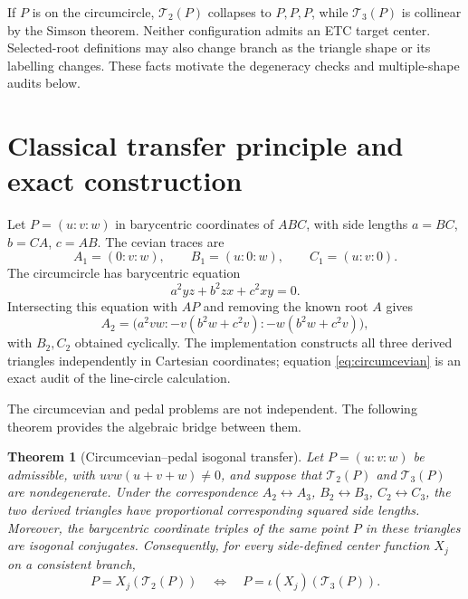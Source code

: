 \documentclass[11pt]{article}
\newtheorem{theorem}{Theorem}
\newcommand{\Circ}{\mathcal T_2}
\newcommand{\Ped}{\mathcal T_3}
\begin{document}
If $P$ is on the circumcircle, $\Circ(P)$ collapses to $P,P,P$, while
$\Ped(P)$ is collinear by the Simson theorem.  Neither configuration admits
an ETC target center.  Selected-root definitions may also change branch as
the triangle shape or its labelling changes.  These facts motivate the
degeneracy checks and multiple-shape audits below.

\section{Classical transfer principle and exact construction}

Let $P=(u:v:w)$ in barycentric coordinates of $ABC$, with side lengths
$a=BC$, $b=CA$, $c=AB$.  The cevian traces are
\[
 A_1=(0:v:w),\qquad B_1=(u:0:w),\qquad C_1=(u:v:0).
\]
The circumcircle has barycentric equation
\[
 a^2yz+b^2zx+c^2xy=0.
\]
Intersecting this equation with $AP$ and removing the known root $A$ gives
\begin{equation}\label{eq:circumcevian}
 A_2=\bigl(a^2vw:-v(b^2w+c^2v):-w(b^2w+c^2v)\bigr),
\end{equation}
with $B_2,C_2$ obtained cyclically.  The implementation constructs all three
derived triangles independently in Cartesian coordinates; equation
\eqref{eq:circumcevian} is an exact audit of the line-circle calculation.

The circumcevian and pedal problems are not independent.  The following
theorem provides the algebraic bridge between them.

\begin{theorem}[Circumcevian--pedal isogonal transfer]
\label{thm:isogonal-transfer}
Let $P=(u:v:w)$ be admissible, with $uvw(u+v+w)\ne0$, and suppose that
$\Circ(P)$ and $\Ped(P)$ are nondegenerate.  Under the correspondence
$A_2\leftrightarrow A_3$, $B_2\leftrightarrow B_3$,
$C_2\leftrightarrow C_3$, the two derived triangles have proportional
corresponding squared side lengths.  Moreover, the barycentric coordinate
triples of the same point $P$ in these triangles are isogonal conjugates.
Consequently, for every side-defined center function $X_j$ on a consistent
branch,
\begin{equation}\label{eq:isogonal-transfer}
 P=X_j(\Circ(P))
 \quad\Longleftrightarrow\quad
 P=\iota(X_j)(\Ped(P)).
\end{equation}
\end{theorem}
\end{document}
